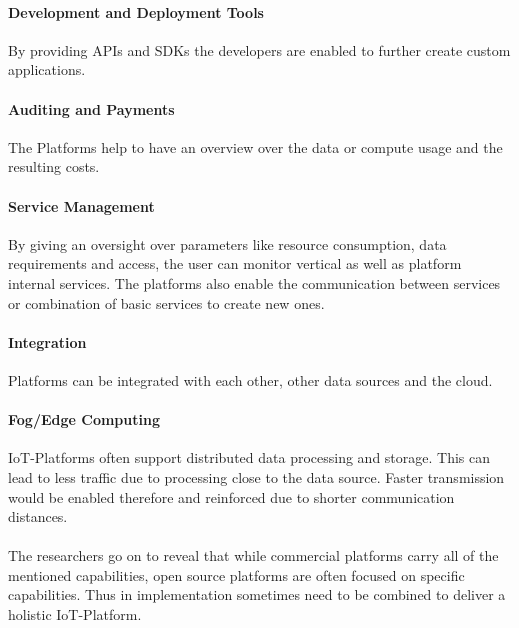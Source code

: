 \paragraph{Development and Deployment Tools}
By providing APIs and SDKs the developers are enabled to further create custom applications.
\paragraph{Auditing and Payments}
The Platforms help to have an overview over the data or compute usage and the resulting costs.
\paragraph{Service Management}
By giving an oversight over parameters like resource consumption, data requirements and access, the user can monitor vertical as well as platform internal services. The platforms also enable the communication between services or combination of basic services to create new ones.
\paragraph{Integration}
Platforms can be integrated with each other, other data sources and the cloud. 
\paragraph{Fog/Edge Computing}
IoT-Platforms often support distributed data processing and storage. This can lead to less traffic due to processing close to the data source. Faster transmission would be enabled therefore and reinforced due to  shorter communication distances.
\\\\The researchers go on to reveal that while commercial platforms carry all of the mentioned capabilities, open source platforms are often focused on specific capabilities. Thus in implementation sometimes need to be combined to deliver a holistic IoT-Platform. 
